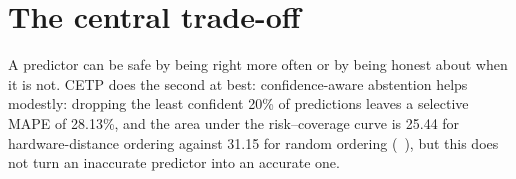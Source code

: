 \section{The central trade-off}
A predictor can be safe by being right more often or by being honest about when it is not. CETP does
the second at best: confidence-aware abstention helps modestly: dropping the least confident 20\% of predictions leaves a
selective MAPE of 28.13\%, and the area under the risk--coverage curve is 25.44 for hardware-distance
ordering against 31.15 for random ordering (\evFILE\ ), but
this does not turn an inaccurate predictor into an accurate one.
